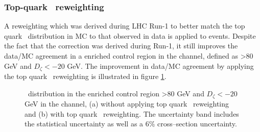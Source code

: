 \subsubsection*{Top-quark \pT~reweighting}
A reweighting which was derived during \ac{LHC} Run-1
to better match the top quark \pT~distribution in \ac{MC}
to that observed in data is applied to \ttbar events. Despite
the fact that the correction was derived during Run-1, it still
improves the data/\ac{MC} agreement in a \ttbar enriched
control region in the \emu channel, defined as 
\MET>80 GeV and $D_{\zeta}<-20$ GeV. The improvement in data/\ac{MC} agreement
by applying the top quark \pT~reweighting is illustrated in figure \ref{fig:mssm_corrs_toppt}.
\begin{figure}[h!]
\begin{center}
\end{center}
\caption{\mTtot~distribution in the \ttbar enriched control region \MET>80 GeV and $D_{\zeta}<-20$ GeV in the \emu channel,
(a) without applying top quark \pT~reweighting and (b) with top quark \pT~reweighting.
The uncertainty band includes the statistical uncertainty as well as a 6\% \ttbar cross--section uncertainty.}
\label{fig:mssm_corrs_toppt}
\end{figure}

